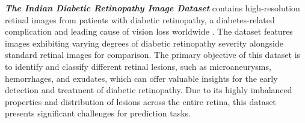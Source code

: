 \textbf{\emph{The Indian Diabetic Retinopathy Image Dataset}} contains high-resolution retinal images from patients with diabetic retinopathy, a diabetes-related complication and leading cause of vision loss worldwide \cite{STITT2016156}. The dataset features images exhibiting varying degrees of diabetic retinopathy severity alongside standard retinal images for comparison. The primary objective of this dataset is to identify and classify different retinal lesions, such as microaneurysms, hemorrhages, and exudates, which can offer valuable insights for the early detection and treatment of diabetic retinopathy. Due to its highly imbalanced properties and distribution of lesions across the entire retina, this dataset presents significant challenges for prediction tasks.

\begin{figure}[H]%
  \centering

\end{figure}
